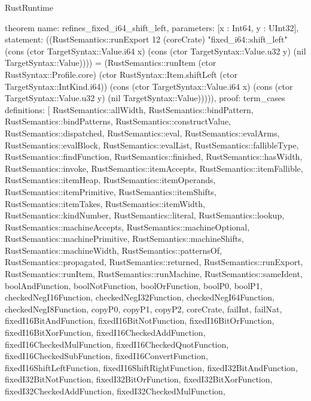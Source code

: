 \begin{lexlean}{RustRuntime}
\begin{semanticmodule}
theorem{
  name: refines_fixed_i64_shift_left,
  parameters: [x : Int64, y : UInt32],
  statement: ((RustSemantics::runExport 12 (coreCrate) "fixed_i64::shift_left" (cons (ctor TargetSyntax::Value.i64 x) (cons (ctor TargetSyntax::Value.u32 y) (nil TargetSyntax::Value)))) = (RustSemantics::runItem (ctor RustSyntax::Profile.core) (ctor RustSyntax::Item.shiftLeft (ctor TargetSyntax::IntKind.i64)) (cons (ctor TargetSyntax::Value.i64 x) (cons (ctor TargetSyntax::Value.u32 y) (nil TargetSyntax::Value))))),
  proof: term_cases{
    definitions: [
      RustSemantics::allWidth,
      RustSemantics::bindPattern,
      RustSemantics::bindPatterns,
      RustSemantics::constructValue,
      RustSemantics::dispatched,
      RustSemantics::eval,
      RustSemantics::evalArms,
      RustSemantics::evalBlock,
      RustSemantics::evalList,
      RustSemantics::fallibleType,
      RustSemantics::findFunction,
      RustSemantics::finished,
      RustSemantics::hasWidth,
      RustSemantics::invoke,
      RustSemantics::itemAccepts,
      RustSemantics::itemFallible,
      RustSemantics::itemHeap,
      RustSemantics::itemOperands,
      RustSemantics::itemPrimitive,
      RustSemantics::itemShifts,
      RustSemantics::itemTakes,
      RustSemantics::itemWidth,
      RustSemantics::kindNumber,
      RustSemantics::literal,
      RustSemantics::lookup,
      RustSemantics::machineAccepts,
      RustSemantics::machineOptional,
      RustSemantics::machinePrimitive,
      RustSemantics::machineShifts,
      RustSemantics::machineWidth,
      RustSemantics::patternsOf,
      RustSemantics::propagated,
      RustSemantics::returned,
      RustSemantics::runExport,
      RustSemantics::runItem,
      RustSemantics::runMachine,
      RustSemantics::sameIdent,
      boolAndFunction,
      boolNotFunction,
      boolOrFunction,
      boolP0,
      boolP1,
      checkedNegI16Function,
      checkedNegI32Function,
      checkedNegI64Function,
      checkedNegI8Function,
      copyP0,
      copyP1,
      copyP2,
      coreCrate,
      failInt,
      failNat,
      fixedI16BitAndFunction,
      fixedI16BitNotFunction,
      fixedI16BitOrFunction,
      fixedI16BitXorFunction,
      fixedI16CheckedAddFunction,
      fixedI16CheckedMulFunction,
      fixedI16CheckedQuotFunction,
      fixedI16CheckedSubFunction,
      fixedI16ConvertFunction,
      fixedI16ShiftLeftFunction,
      fixedI16ShiftRightFunction,
      fixedI32BitAndFunction,
      fixedI32BitNotFunction,
      fixedI32BitOrFunction,
      fixedI32BitXorFunction,
      fixedI32CheckedAddFunction,
      fixedI32CheckedMulFunction,
}}
\end{semanticmodule}
\end{lexlean}
